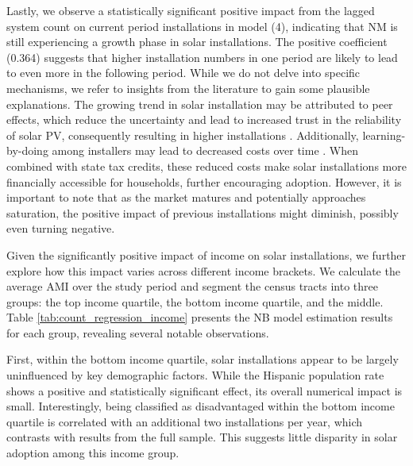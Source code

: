 \documentclass[11pt,twoside,letterpaper]{article}
\begin{document}
Lastly, we observe a statistically significant positive impact from the lagged system count on current period installations in model (4), indicating that NM is still experiencing a growth phase in solar installations. The positive coefficient (0.364) suggests that higher installation numbers in one period are likely to lead to even more in the following period. While we do not delve into specific mechanisms, we refer to insights from the literature to gain some plausible explanations. The growing trend in solar installation may be attributed to peer effects, which reduce the uncertainty and lead to increased trust in the reliability of solar PV, consequently resulting in higher installations \parencite{oshaughnessy_role_2023}.  Additionally, learning-by-doing among installers may lead to decreased costs over time \parencite{oshaughnessy_non-monotonic_2019}. When combined with state tax credits, these reduced costs make solar installations more financially accessible for households, further encouraging adoption. However, it is important to note that as the market matures and potentially approaches saturation, the positive impact of previous installations might diminish, possibly even turning negative.

Given the significantly positive impact of income on solar installations, we further explore how this impact varies across different income brackets. 
% 
% 
% 
We calculate the average AMI over the study period and segment the census tracts into three groups: the top income quartile, the bottom income quartile, and the middle. Table \ref{tab:count_regression_income} presents the NB model estimation results for each group, revealing several notable observations.

First, within the bottom income quartile, solar installations appear to be largely uninfluenced by key demographic factors. While the Hispanic population rate shows a positive and statistically significant effect, its overall numerical impact is small. Interestingly, being classified as disadvantaged within the bottom income quartile is correlated with an additional two installations per year, which contrasts with results from the full sample. This suggests little disparity in solar adoption among this income group. 
\end{document}
